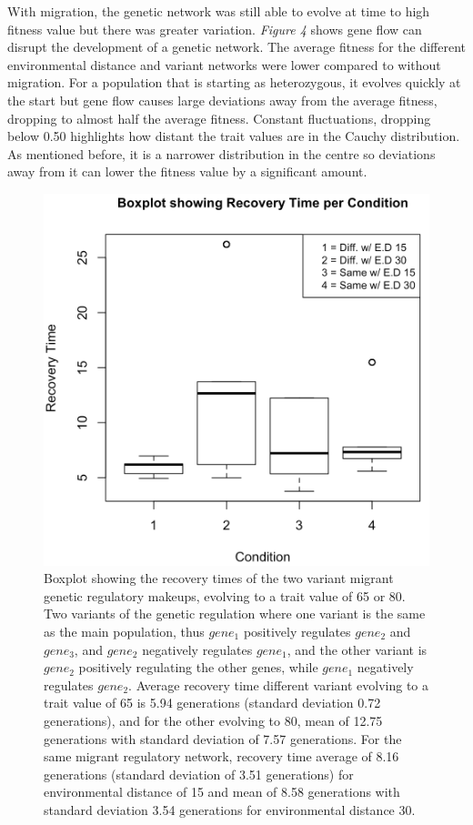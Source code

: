 \newpage
With migration, the genetic network was still able to evolve at time to high fitness value but there was greater variation. \textit{Figure 4} shows gene flow can disrupt the development of a genetic network. The average fitness for the different environmental distance and variant networks were lower compared to without migration. For a population that is starting as heterozygous, it evolves quickly at the start but gene flow causes large deviations away from the average fitness, dropping to almost half the average fitness. Constant fluctuations, dropping below 0.50 highlights how distant the trait values are in the Cauchy distribution. As mentioned before, it is a narrower distribution in the centre so deviations away from it can lower the fitness value by a significant amount.\\
\begin{figure}
    \begin{center}
        \includegraphics[scale=0.35]{../Results/boxplot_recovery_time.jpg}
    \end{center}
    \caption{Boxplot showing the recovery times of the two variant migrant genetic regulatory makeups, evolving to a trait value of 65 or 80. Two variants of the genetic regulation where one variant is the same as the main population, thus $gene_1$ positively regulates $gene_2$ and $gene_3$, and $gene_2$ negatively regulates $gene_1$, and the other variant is $gene_2$ positively regulating the other genes, while $gene_1$ negatively regulates $gene_2$. Average recovery time different variant evolving to a trait value of 65 is 5.94 generations (standard deviation 0.72 generations), and for the other evolving to 80, mean of 12.75 generations with standard deviation of 7.57 generations. For the same migrant regulatory network, recovery time average of 8.16 generations (standard deviation of 3.51 generations) for environmental distance of 15 and mean of 8.58 generations with standard deviation 3.54 generations for environmental distance 30.}
    \label{fig:Recovery time}
\end{figure}
